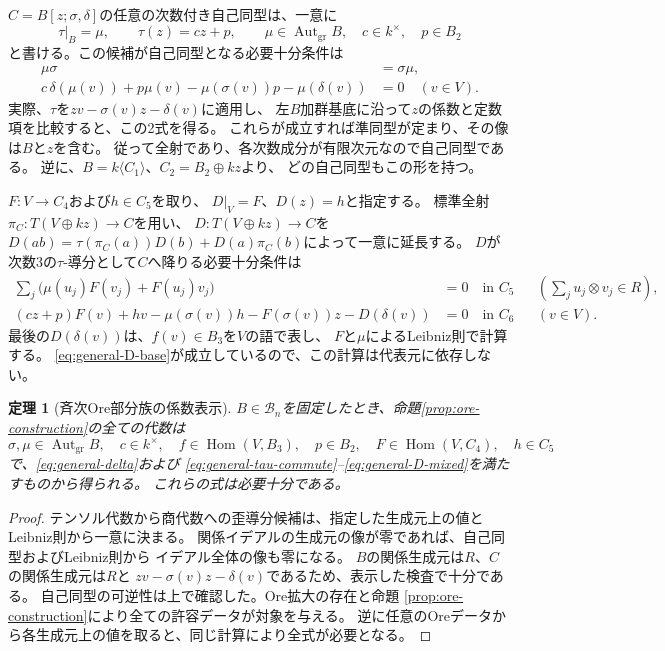 \documentclass[11pt,a4paper]{ltjsarticle}
\newtheorem{theorem}{定理}[section]
\theoremstyle{definition}
\newcommand{\Aut}{\operatorname{Aut}}
\newcommand{\Hom}{\operatorname{Hom}}
\newcommand{\Bclass}{\mathcal B}
\begin{document}
$C=B[z;\sigma,\delta]$の任意の次数付き自己同型は、一意に
\[
\tau|_B=\mu,\qquad \tau(z)=cz+p,\qquad
\mu\in\Aut_{\mathrm{gr}}B,\quad c\in k^\times,\quad p\in B_2
\]
と書ける。この候補が自己同型となる必要十分条件は
\begin{align}
\mu\sigma&=\sigma\mu,\label{eq:general-tau-commute}\\
c\,\delta(\mu(v))+p\mu(v)-\mu(\sigma(v))p-\mu(\delta(v))&=0
\quad(v\in V).\label{eq:general-tau-constant}
\end{align}
実際、$\tau$を$zv-\sigma(v)z-\delta(v)$に適用し、
左$B$加群基底に沿って$z$の係数と定数項を比較すると、この2式を得る。
これらが成立すれば準同型が定まり、その像は$B$と$z$を含む。
従って全射であり、各次数成分が有限次元なので自己同型である。
逆に、$B=k\langle C_1\rangle$、$C_2=B_2\oplus kz$より、
どの自己同型もこの形を持つ。

$F:V\to C_4$および$h\in C_5$を取り、
$D|_V=F$、$D(z)=h$と指定する。
標準全射$\pi_C:T(V\oplus kz)\to C$を用い、
$D:T(V\oplus kz)\to C$を
$D(ab)=\tau(\pi_C(a))D(b)+D(a)\pi_C(b)$によって一意に延長する。
$D$が次数3の$\tau$-導分として$C$へ降りる必要十分条件は
\begin{align}
\sum_j\bigl(\mu(u_j)F(v_j)+F(u_j)v_j\bigr)&=0
\quad\text{in }C_5
&&\left(\sum_j u_j\otimes v_j\in R\right),\label{eq:general-D-base}\\
(cz+p)F(v)+hv-\mu(\sigma(v))h-F(\sigma(v))z-D(\delta(v))&=0
\quad\text{in }C_6
&& (v\in V).\label{eq:general-D-mixed}
\end{align}
最後の$D(\delta(v))$は、$f(v)\in B_3$を$V$の語で表し、
$F$と$\mu$によるLeibniz則で計算する。
\eqref{eq:general-D-base}が成立しているので、この計算は代表元に依存しない。

\begin{theorem}[斉次Ore部分族の係数表示]\label{thm:general-coefficients}
$B\in\Bclass_n$を固定したとき、命題\ref{prop:ore-construction}の全ての代数は
\[
\sigma,\mu\in\Aut_{\mathrm{gr}}B,\quad c\in k^\times,\quad
f\in\Hom(V,B_3),\quad p\in B_2,\quad
F\in\Hom(V,C_4),\quad h\in C_5
\]
で、\eqref{eq:general-delta}および
\eqref{eq:general-tau-commute}--\eqref{eq:general-D-mixed}を満たすものから得られる。
これらの式は必要十分である。
\end{theorem}

\begin{proof}
テンソル代数から商代数への歪導分候補は、指定した生成元上の値とLeibniz則から一意に決まる。
関係イデアルの生成元の像が零であれば、自己同型およびLeibniz則から
イデアル全体の像も零になる。
$B$の関係生成元は$R$、$C$の関係生成元は$R$と
$zv-\sigma(v)z-\delta(v)$であるため、表示した検査で十分である。
自己同型の可逆性は上で確認した。Ore拡大の存在と命題
\ref{prop:ore-construction}により全ての許容データが対象を与える。
逆に任意のOreデータから各生成元上の値を取ると、同じ計算により全式が必要となる。
\end{proof}
\end{document}
